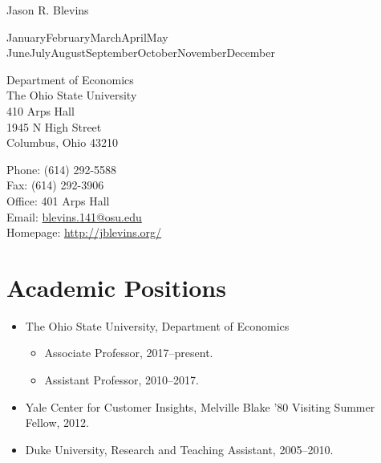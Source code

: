 \documentclass[10pt,letterpaper]{article}
\def\name{Jason R. Blevins}
\renewcommand{\today}{\ifcase \month \or January\or February\or March\or April\or May%
\or June\or July\or August\or September\or October\or November\or December\fi%
\space \number \year}
\begin{document}
\name


\bigskip
\today

\bigskip
\begin{minipage}[t]{0.495\textwidth}
  Department of Economics \\
  The Ohio State University \\
  410 Arps Hall \\
  1945 N High Street \\
  Columbus, Ohio 43210
\end{minipage}
\begin{minipage}[t]{0.495\textwidth}
  Phone: (614) 292-5588 \\
  Fax: (614) 292-3906 \\
  Office: 401 Arps Hall \\
  Email: \href{mailto:blevins.141@osu.edu}{blevins.141@osu.edu} \\
  Homepage: \href{http://jblevins.org/}{http://jblevins.org/}
\end{minipage}

\section*{Academic Positions}

\begin{itemize}
\item The Ohio State University, Department of Economics
  \begin{itemize}
  \item Associate Professor, 2017--present.
  \item Assistant Professor, 2010--2017.
  \end{itemize}
\item Yale Center for Customer Insights,
  Melville Blake '80 Visiting Summer Fellow,
  2012.
\item Duke University,
  Research and Teaching Assistant,
  2005--2010.
\end{itemize}
\end{document}
